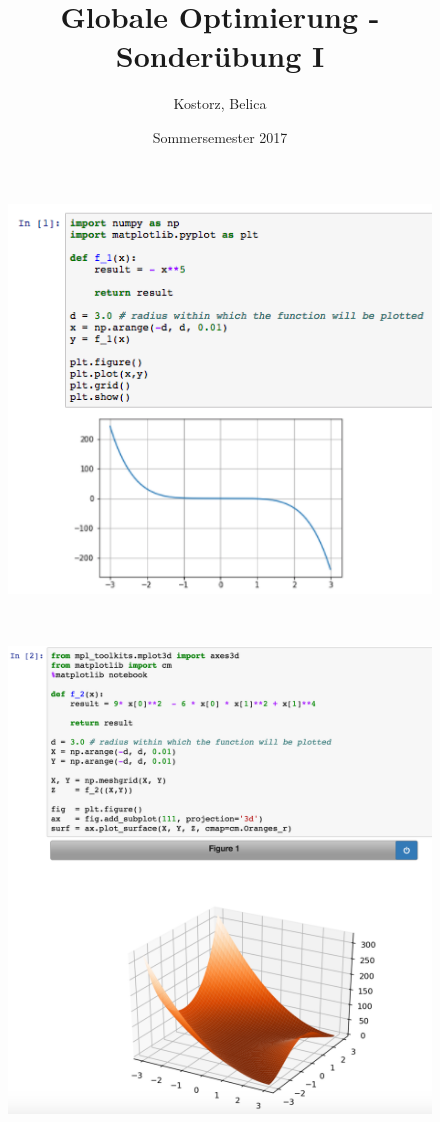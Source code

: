 \documentclass[12pt]{extreport} %
\title{Globale Optimierung - Sonderübung I}
\author{Kostorz, Belica}
\date{Sommersemester 2017}
\theoremstyle{named}
\theoremstyle{nnamed}
\theoremstyle{itshape}
\theoremstyle{normal}
\begin{document}
\thispagestyle{empty}

\thispagestyle{firststyle}
\begin{figure}[h!]
  \centering
  \includegraphics[scale=0.55]{img/sui-i}
  \label{fig:sub1}
\end{figure} ~\smallskip

\begin{figure}[h!]
  \centering
  \includegraphics[scale=0.41]{img/sui-ii}
  \label{fig:sub2}
\end{figure}
\end{document}
